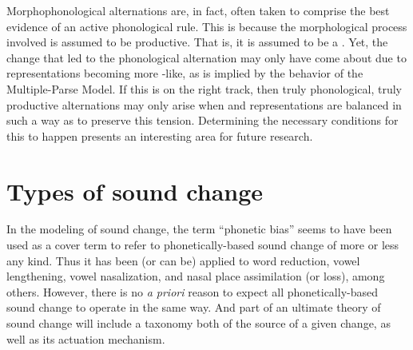 Morphophonological alternations are, in fact, often taken to comprise
the best evidence of an active phonological rule. This is because
the morphological process involved is assumed to be productive. That
is, it is assumed to be a . Yet, the change that led
to the phonological alternation may only have come about due to representations
becoming more -like, as is implied by the behavior of
the Multiple-Parse Model. If this is on the right track, then truly
phonological, truly productive alternations may only arise when 
and  representations are balanced in such a way as to
preserve this tension. Determining the necessary conditions for this
to happen presents an interesting area for future research.

\section{Types of sound change}

In the modeling of sound change, the term “phonetic bias” seems
to have been used as a cover term to refer to phonetically-based sound
change of more or less any kind. Thus it has been (or can be) applied
to word reduction, vowel lengthening, vowel nasalization, and nasal
place assimilation (or loss), among others. However, there is no \emph{a priori}
reason to expect all phonetically-based sound change to operate in
the same way. And part of an ultimate theory of sound change
will include a taxonomy both of the source of a given change, as well
as its actuation mechanism. 

